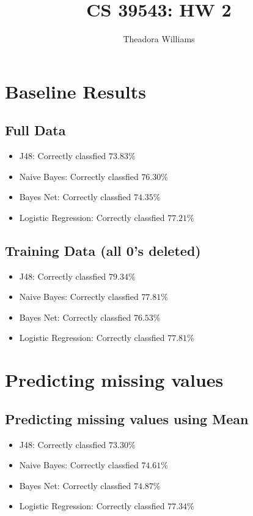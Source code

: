 \documentclass{article}
\title{CS 39543: HW 2}
\author{Theadora Williams}
\begin{document}
\maketitle

\section{\small{Baseline Results}}
\subsection{\small{Full Data }}
\begin{itemize}
\item J48: Correctly classfied $73.83 \% $
\item Naive Bayes: Correctly classfied $76.30 \%$
\item Bayes Net: Correctly classfied $74.35 \%$
\item Logistic Regression: Correctly classfied $77.21 \%$
\end{itemize}

\subsection{\small{Training Data (all 0's deleted)}}
\begin{itemize}
\item J48: Correctly classfied $79.34 \%$
\item Naive Bayes: Correctly classfied $77.81 \%$
\item Bayes Net: Correctly classfied $76.53 \%$
\item Logistic Regression: Correctly classfied $77.81 \%$
\end{itemize}

\section{\small{Predicting missing values }}
\subsection{\small{Predicting missing values using Mean }}
\begin{itemize}
\item J48: Correctly classfied $73.30 \%$
\item Naive Bayes: Correctly classfied $74.61 \%$
\item Bayes Net: Correctly classfied $74.87 \%$
\item Logistic Regression: Correctly classfied $77.34 \%$
\end{itemize}
\end{document}
